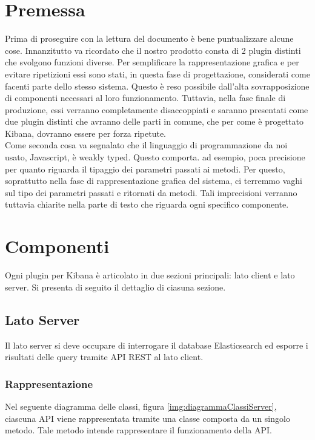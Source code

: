 
\section{Premessa}
Prima di proseguire con la lettura del documento è bene puntualizzare alcune cose.
Innanzitutto va ricordato che il nostro prodotto consta di 2 plugin distinti che svolgono funzioni diverse. Per semplificare la rappresentazione grafica e per evitare ripetizioni essi sono stati, in questa fase di progettazione, considerati come facenti parte dello stesso sistema. Questo è reso possibile dall'alta sovrapposizione di componenti necessari al loro funzionamento. Tuttavia, nella fase finale di produzione, essi verranno completamente disaccoppiati e saranno presentati come due plugin distinti che avranno delle parti in comune, che per come è progettato Kibana, dovranno essere per forza ripetute.\\
Come seconda cosa va segnalato che il linguaggio di programmazione da noi usato, Javascript, è weakly typed. Questo comporta. ad esempio, poca precisione per quanto riguarda il tipaggio dei parametri passati ai metodi. Per questo, soprattutto nella fase di rappresentazione grafica del sistema, ci terremmo vaghi sul tipo dei parametri passati e ritornati da metodi. Tali imprecisioni verranno tuttavia chiarite nella parte di testo che riguarda ogni specifico componente.

\section{Componenti}

Ogni plugin per Kibana è articolato in due sezioni principali: lato client e lato server. Si presenta di seguito il dettaglio di ciasuna sezione.

\subsection{Lato Server}
Il lato server si deve occupare di interrogare il database Elasticsearch ed esporre i risultati delle query tramite API REST al lato client.
\subsubsection{Rappresentazione}
Nel seguente diagramma delle classi, figura \ref{img:diagrammaClassiServer}, ciascuna API viene rappresentata tramite una classe composta da un singolo metodo. Tale metodo intende rappresentare il funzionamento della API.


